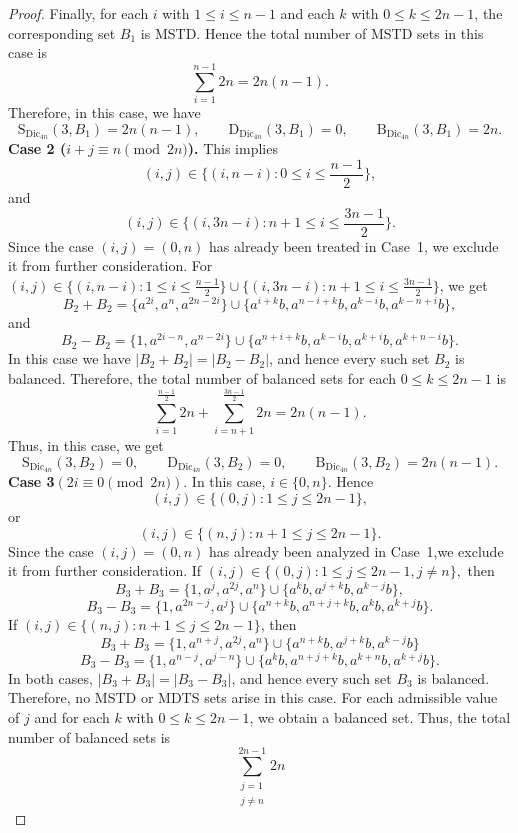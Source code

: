 \documentclass[10pt,a4paper]{amsart}
\begin{document}
\begin{proof}
Finally, for each $i$ with $1\le i\le n-1$ and each $k$ with $0\le k\le 2n-1$, the corresponding set $B_1$ is MSTD. Hence the total number of MSTD sets in this case is
$$\sum_{i=1}^{n-1}2n=2n(n-1).$$
Therefore, in this case, we have 
\begin{equation}\label{eq:case1-counts}
\mathrm{S}_{\mathrm{Dic}_{4n}}(3,B_1)=2n(n-1), \qquad
\mathrm{D}_{\mathrm{Dic}_{4n}}(3,B_1)=0, \qquad
\mathrm{B}_{\mathrm{Dic}_{4n}}(3,B_1)=2n.
\end{equation}
\textbf{Case 2 ($i+j\equiv n \pmod{2n}$).} This implies 
$$(i,j)\in\{(i,n-i): 0\le i\le \frac{n-1}{2}\},$$
and $$(i,j)\in \{(i,3n-i) :n+1\le i\le \frac{3n-1}{2}\}.$$
Since the case $(i,j)=(0,n)$ has already been treated in Case~1, we exclude it from further consideration. For $(i,j)\in\{(i,n-i): 1\le i\le \frac{n-1}{2}\}\cup \{(i,3n-i) :n+1\le i\le \frac{3n-1}{2}\}$, we get 
$$B_2+B_2=\{a^{2i},a^{n},a^{2n-2i}\}\cup
\{a^{i+k}b,a^{n-i+k}b,a^{k-i}b,a^{k-n+i}b\},
$$
and 
$$B_2-B_2=\{1,a^{2i-n},a^{n-2i}\}\cup
\{a^{n+i+k}b,a^{k-i}b,a^{k+i}b,a^{k+n-i}b\}.
$$ In this case we have $|B_2+B_2|=|B_2-B_2|$, and hence every such set $B_2$ is balanced.  Therefore, the total number of balanced sets for each $0\leq k \leq 2n-1$ is
$$\sum_{i=1}^{\frac{n-1}{2}}2n+\sum_{i=n+1}^{\frac{3n-1}{2}}2n
=2n(n-1).
$$
Thus, in this case, we get 
\begin{equation}\label{eq:case2-counts}
\mathrm{S}_{\mathrm{Dic}_{4n}}(3,B_2)=0, \qquad
\mathrm{D}_{\mathrm{Dic}_{4n}}(3,B_2)=0, \qquad
\mathrm{B}_{\mathrm{Dic}_{4n}}(3,B_2)=2n(n-1).
\end{equation}
\textbf{Case 3}$(2i\equiv 0 \pmod{2n})$. 
In this case, $i\in \{0,n\}$. Hence  $$(i,j)\in \{(0,j):1\leq j\leq 2n-1\},$$ or  $$(i,j)\in\{(n,j): n+1\leq j\leq 2n-1\}.$$ Since the case $(i,j)=(0,n)$ has already been analyzed in Case~1,we exclude it from further consideration.  
If $(i,j)\in \{(0,j):1\leq j\leq 2n-1,j\neq n\},$ then  
$$B_{3}+B_{3}=\{1,a^{j},a^{2j},a^n\}\cup\{a^{k}b,a^{j+k}b,a^{k-j}b\},$$ 
$$B_{3}-B_{3}=\{1,a^{2n-j},a^{j}\}\cup \{a^{n+k}b,a^{n+j+k}b,a^{k}b,a^{k+j}b\}.$$
If $(i,j)\in\{(n,j): n+1\leq j\leq 2n-1\}$, then
$$B_{3}+B_{3}=\{1,a^{n+j},a^{2j},a^n\}\cup\{a^{n+k}b,a^{j+k}b,a^{k-j}b\}$$ 
$$B_{3}-B_{3}=\{1,a^{n-j},a^{j-n}\}\cup \{a^{k}b,a^{n+j+k}b,a^{k+n}b,a^{k+j}b\}.$$
In both cases, $|B_3+B_3|=|B_3-B_3|$, and hence every such set $B_3$ is balanced. Therefore, no MSTD or MDTS sets arise in this case. 
For each admissible value of $j$ and for each $k$ with $0\le k\le 2n-1$, we obtain a balanced set. Thus, the total number of balanced sets is
$$
\sum_{\substack{j=1 \\ j\neq n}}^{2n-1}2n
$$
\end{proof}
\end{document}

